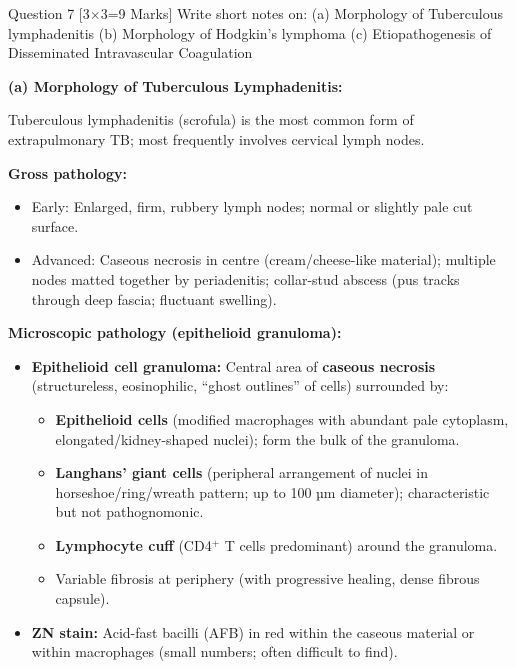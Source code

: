 \documentclass[11pt,a4paper]{article}
\begin{document}
\begin{qbox}{Question 7 [3$\times$3=9 Marks]}
Write short notes on: (a) Morphology of Tuberculous lymphadenitis \quad (b) Morphology of Hodgkin's lymphoma \quad (c) Etiopathogenesis of Disseminated Intravascular Coagulation
\end{qbox}

\begin{ansbox}
\textbf{(a) Morphology of Tuberculous Lymphadenitis:}

Tuberculous lymphadenitis (scrofula) is the most common form of extrapulmonary TB; most frequently involves cervical lymph nodes.

\textbf{Gross pathology:}
\begin{itemize}[leftmargin=*]
    \item Early: Enlarged, firm, rubbery lymph nodes; normal or slightly pale cut surface.
    \item Advanced: Caseous necrosis in centre (cream/cheese-like material); multiple nodes matted together by periadenitis; collar-stud abscess (pus tracks through deep fascia; fluctuant swelling).
\end{itemize}

\textbf{Microscopic pathology (epithelioid granuloma):}
\begin{itemize}[leftmargin=*]
    \item \textbf{Epithelioid cell granuloma:} Central area of \textbf{caseous necrosis} (structureless, eosinophilic, ``ghost outlines'' of cells) surrounded by:
    \begin{itemize}
        \item \textbf{Epithelioid cells} (modified macrophages with abundant pale cytoplasm, elongated/kidney-shaped nuclei); form the bulk of the granuloma.
        \item \textbf{Langhans' giant cells} (peripheral arrangement of nuclei in horseshoe/ring/wreath pattern; up to 100 µm diameter); characteristic but not pathognomonic.
        \item \textbf{Lymphocyte cuff} (CD4$^+$ T cells predominant) around the granuloma.
        \item Variable fibrosis at periphery (with progressive healing, dense fibrous capsule).
    \end{itemize}
    \item \textbf{ZN stain:} Acid-fast bacilli (AFB) in red within the caseous material or within macrophages (small numbers; often difficult to find).
\end{itemize}


\end{ansbox}
\end{document}
